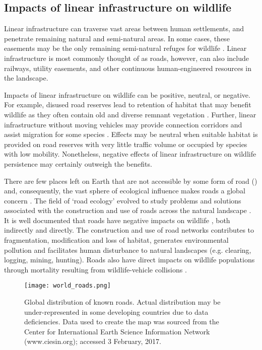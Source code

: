 \subsection{Impacts of linear infrastructure on wildlife}

Linear infrastructure can traverse vast areas between human settlements, and penetrate remaining natural and semi-natural areas. In some cases, these easements may be the only remaining semi-natural refuges for wildlife \citep{benn91}. Linear infrastructure is most commonly thought of as roads, however, can also include railways, utility easements, and other continuous human-engineered resources in the landscape.

Impacts of linear infrastructure on wildlife can be positive, neutral, or negative. For example, disused road reserves lead to retention of habitat that may benefit wildlife as they often contain old and diverse remnant vegetation \citep{lent11}. Further, linear infrastructure without moving vehicles may provide connection corridors and assist migration for some species \citep{rvdr15}. Effects may be neutral when suitable habitat is provided on road reserves with very little traffic volume or occupied by species with low mobility. Nonetheless, negative effects of linear infrastructure on wildlife persistence may certainly outweigh the benefits.

There are few places left on Earth that are not accessible by some form of road () and, consequently, the vast sphere of ecological influence makes roads a global concern \citep{laur14}. The field of `road ecology' evolved to study problems and solutions associated with the construction and use of roads across the natural landscape \citep[see][]{form03}. It is well documented that roads have negative impacts on wildlife \citep{form98,spel98,rvdr15}, both indirectly and directly. The construction and use of road networks contributes to fragmentation, modification and loss of habitat, generates environmental pollution and facilitates human disturbance to natural landscapes (e.g. clearing, logging, mining, hunting). Roads also have direct impacts on wildlife populations through mortality resulting from wildlife-vehicle collisions \citep{fahr09}.

\begin{figure*}[!h]
  \centering
  \texttt{[image: world\_roads.png]}
  \caption[Global distribution of known roads]{Global distribution of known roads. Actual distribution may be under-represented in some developing countries due to data deficiencies. Data used to create the map was sourced from the Center for International Earth Science Information Network (www.ciesin.org); accessed 3 February, 2017.}
  \label{roads}
\end{figure*}

